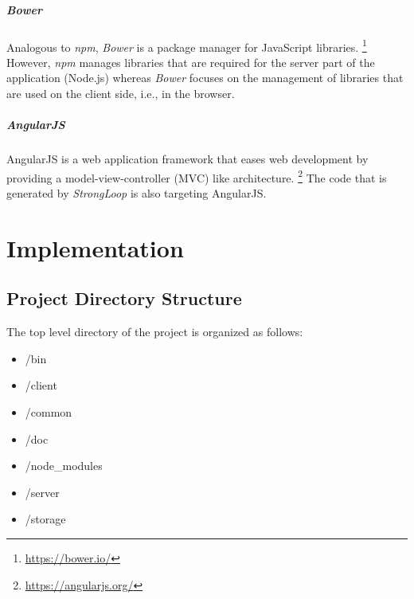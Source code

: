 \documentclass[nochapterpage,nopartpage,noheadingspace,numbersubsubsec,bigchapter,colorback,accentcolor=tud9c,10pt]{tudreport}
\begin{document}
  \paragraph{Bower}
    Analogous to \emph{npm}, \emph{Bower} is a package manager for JavaScript libraries.%
    \footnote{\url{https://bower.io/}}
    However, \emph{npm} manages libraries that are required for the server part of the application (Node.js) whereas \emph{Bower} focuses on the management of libraries that are used on the client side, i.e., in the browser.

  \paragraph{AngularJS}
    AngularJS is a web application framework that eases web development by providing a model-view-controller (MVC) like architecture.%
    \footnote{\url{https://angularjs.org/}}
    The code that is generated by \emph{StrongLoop} is also targeting AngularJS.

  \chapter{Implementation}
  \label{ch:tech:implementation}


  \section{Project Directory Structure}
  \label{sec:tech:implementation:dirs}

    The top level directory of the project is organized as follows:
        \begin{multicols}{4}
            \begin{itemize}
                \item /bin
                \item /client
                \item /common
                \item /doc
                \item /node\_modules
                \item /server
                \item /storage
            \end{itemize}
        \end{multicols}
\end{document}
